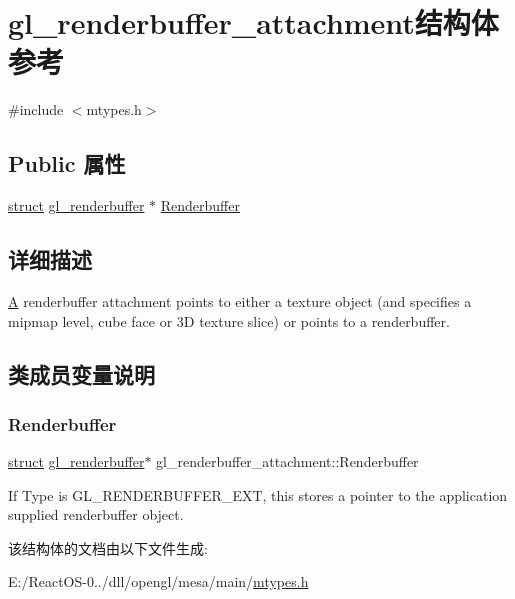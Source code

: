 \hypertarget{structgl__renderbuffer__attachment}{}\section{gl\+\_\+renderbuffer\+\_\+attachment结构体 参考}
\label{structgl__renderbuffer__attachment}


{\ttfamily \#include $<$mtypes.\+h$>$}

\subsection*{Public 属性}
\begin{DoxyCompactItemize}
\item 
\hyperlink{interfacestruct}{struct} \hyperlink{structgl__renderbuffer}{gl\+\_\+renderbuffer} $\ast$ \hyperlink{structgl__renderbuffer__attachment_a960fcb83202596bedb26865fcc856b62}{Renderbuffer}
\end{DoxyCompactItemize}


\subsection{详细描述}
\hyperlink{struct_a}{A} renderbuffer attachment points to either a texture object (and specifies a mipmap level, cube face or 3D texture slice) or points to a renderbuffer. 

\subsection{类成员变量说明}
\mbox{\label{structgl__renderbuffer__attachment_a960fcb83202596bedb26865fcc856b62}} 
\subsubsection{\texorpdfstring{Renderbuffer}{Renderbuffer}}
{\footnotesize\ttfamily \hyperlink{interfacestruct}{struct} \hyperlink{structgl__renderbuffer}{gl\+\_\+renderbuffer}$\ast$ gl\+\_\+renderbuffer\+\_\+attachment\+::\+Renderbuffer}

If {\ttfamily Type} is {\ttfamily G\+L\+\_\+\+R\+E\+N\+D\+E\+R\+B\+U\+F\+F\+E\+R\+\_\+\+E\+XT}, this stores a pointer to the application supplied renderbuffer object. 

该结构体的文档由以下文件生成\+:\begin{DoxyCompactItemize}
\item 
E\+:/\+React\+O\+S-\/0../dll/opengl/mesa/main/\hyperlink{mtypes_8h}{mtypes.\+h}\end{DoxyCompactItemize}
